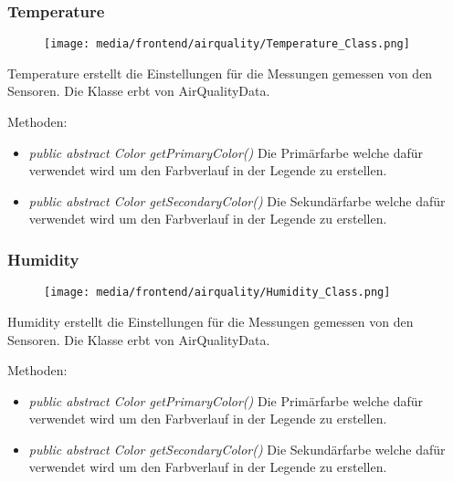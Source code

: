 \subsubsection{Temperature}
\begin{minipage}{0.3\textwidth}
    \begin{figure}[H]
        \texttt{[image: media/frontend/airquality/Temperature\_Class.png]}
    \end{figure}
    \end{minipage} \hfill
    \begin{minipage}{0.6\textwidth}
Temperature erstellt die Einstellungen für die Messungen gemessen von den Sensoren. Die Klasse erbt von AirQualityData.
\end{minipage}

Methoden:
\begin{itemize} 
	\item \emph{public abstract Color getPrimaryColor()} Die Primärfarbe welche dafür verwendet wird um den Farbverlauf in der Legende zu erstellen.
	\item \emph{public abstract Color getSecondaryColor()} Die Sekundärfarbe welche dafür verwendet wird um den Farbverlauf in der Legende zu erstellen.
\end{itemize}

\subsubsection{Humidity}
\begin{minipage}{0.3\textwidth}
    \begin{figure}[H]
        \texttt{[image: media/frontend/airquality/Humidity\_Class.png]}
    \end{figure}
    \end{minipage} \hfill
    \begin{minipage}{0.6\textwidth}
Humidity erstellt die Einstellungen für die Messungen gemessen von den Sensoren. Die Klasse erbt von AirQualityData.
\end{minipage}

Methoden:
\begin{itemize} 
	\item \emph{public abstract Color getPrimaryColor()} Die Primärfarbe welche dafür verwendet wird um den Farbverlauf in der Legende zu erstellen.
	\item \emph{public abstract Color getSecondaryColor()} Die Sekundärfarbe welche dafür verwendet wird um den Farbverlauf in der Legende zu erstellen.
\end{itemize}

